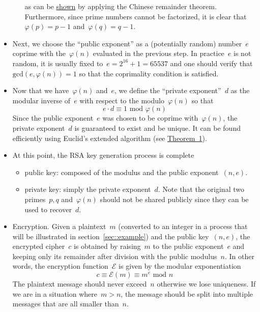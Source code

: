 \documentclass{article}
\begin{document}
\begin{itemize}
\begin{itemize}
\begin{equation}
    \label{eq:totient}
    \end{equation}
    as can be \href{https://en.wikipedia.org/wiki/Euler's_totient_function}{shown} by applying the Chinese remainder theorem.  Furthermore, since prime numbers cannot be factorized, it is clear that~$\varphi(p) = p-1$ and~$\varphi(q) = q-1$.
\end{itemize}
\item Next, we choose the ``public exponent'' as a (potentially random) number~$e$ coprime with the~$\varphi(n)$ evaluated in the previous step.  In practice~$e$ is not random, it is usually fixed to~$e = 2^{16} + 1 = 65537$ and one should verify that~$\text{gcd}(e, \varphi(n)) = 1$ so that the coprimality condition is satisfied.
\item Now that we have~$\varphi(n)$ and~$e$, we define the ``private exponent''~$d$ as the modular inverse of~$e$ with respect to the modulo~$\varphi(n)$ so that
\begin{equation}
e \cdot d \equiv 1 \,\,\text{mod}\,\, \varphi(n)
\label{eq:privateExp}
\end{equation}
Since the public exponent~$e$ was chosen to be coprime with~$\varphi(n)$, the private exponent~$d$ is guaranteed to exist and be unique.  It can be found efficiently using Euclid's extended algorithm (see \hyperlink{theorem1}{Theorem~1}).
\item At this point, the RSA key generation process is complete
\begin{itemize}
    \item public key: composed of the modulus and the public exponent~$(n, e)$.
    \item private key: simply the private exponent~$d$.  Note that the original two primes~$p, q$ and~$\varphi(n)$ should not be shared publicly since they can be used to recover~$d$.
\end{itemize}
\item Encryption.  Given a plaintext~$m$ (converted to an integer in a process that will be illustrated in section~\ref{sec::example}) and the public key~$(n, e)$, the encrypted cipher~$c$ is obtained by raising~$m$ to the public exponent~$e$ and keeping only its remainder after division with the public modulus~$n$.  In other words, the encryption function~$\mathcal{E}$ is given by the modular exponentiation
\begin{equation}
c \equiv \mathcal{E}(m) \equiv m^e \,\,\text{mod}\,\,n
\label{eq::RSA_encrypt}
\end{equation}
The plaintext message should never exceed~$n$ otherwise we lose uniqueness.  If we are in a situation where~$m > n$, the message should be split into multiple messages that are all smaller than~$n$.

\end{itemize}
\end{document}
